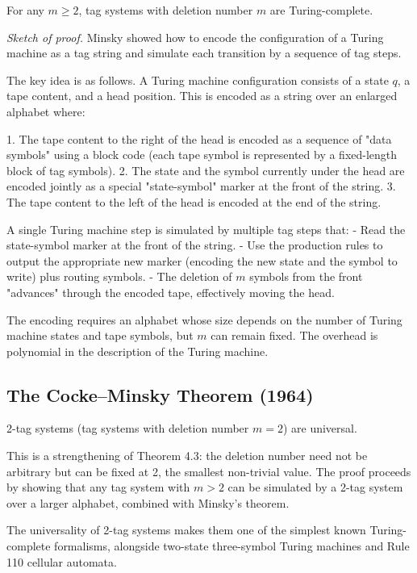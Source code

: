 \begin{theorem}[Minsky, 1961]
For any $m \geq 2$, tag systems with deletion number $m$ are Turing-complete.

\textit{Sketch of proof.} Minsky showed how to encode the configuration of a Turing machine as a tag string and simulate each transition by a sequence of tag steps.

The key idea is as follows. A Turing machine configuration consists of a state $q$, a tape content, and a head position. This is encoded as a string over an enlarged alphabet where:

1. The tape content to the right of the head is encoded as a sequence of "data symbols" using a block code (each tape symbol is represented by a fixed-length block of tag symbols).
2. The state and the symbol currently under the head are encoded jointly as a special "state-symbol" marker at the front of the string.
3. The tape content to the left of the head is encoded at the end of the string.

A single Turing machine step is simulated by multiple tag steps that:
- Read the state-symbol marker at the front of the string.
- Use the production rules to output the appropriate new marker (encoding the new state and the symbol to write) plus routing symbols.
- The deletion of $m$ symbols from the front "advances" through the encoded tape, effectively moving the head.

The encoding requires an alphabet whose size depends on the number of Turing machine states and tape symbols, but $m$ can remain fixed. The overhead is polynomial in the description of the Turing machine. 

\end{theorem}


\subsection{The Cocke--Minsky Theorem (1964)}

\begin{theorem}
2-tag systems (tag systems with deletion number $m = 2$) are universal.

This is a strengthening of Theorem 4.3: the deletion number need not be arbitrary but can be fixed at 2, the smallest non-trivial value. The proof proceeds by showing that any tag system with $m > 2$ can be simulated by a 2-tag system over a larger alphabet, combined with Minsky's theorem.

The universality of 2-tag systems makes them one of the simplest known Turing-complete formalisms, alongside two-state three-symbol Turing machines and Rule 110 cellular automata.
\end{theorem}

